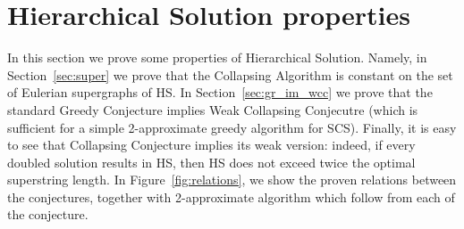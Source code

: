 \section{Hierarchical Solution properties}
In this section we prove some properties of Hierarchical Solution. Namely, in Section~\ref{sec:super} we prove that the Collapsing Algorithm is constant on the set of Eulerian supergraphs of HS. In Section~\ref{sec:gr_im_wcc} we prove that the standard Greedy Conjecture implies Weak Collapsing Conjecutre (which is sufficient for a simple 2-approximate greedy algorithm for SCS). Finally, it is easy to see that Collapsing Conjecture implies its weak version: indeed, if every doubled solution results in HS, then HS does not exceed twice the optimal superstring length. In Figure~\ref{fig:relations}, we show the proven relations between the conjectures, together with 2-approximate algorithm which follow from each of the conjecture.

